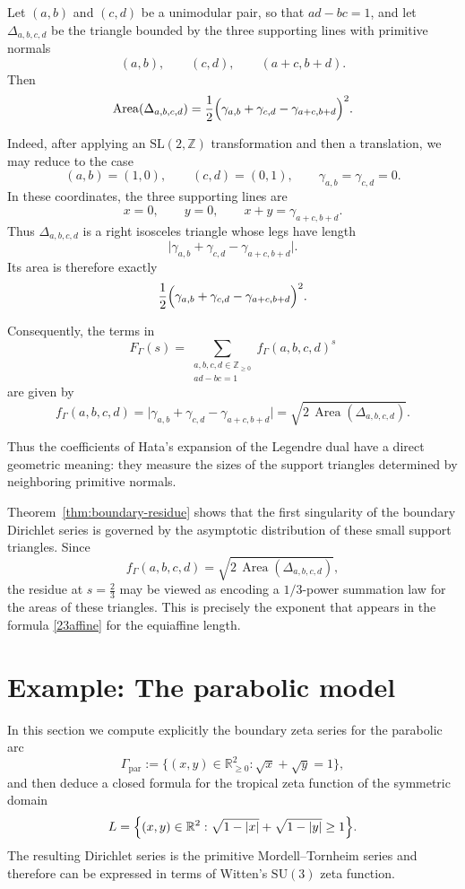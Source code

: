 \documentclass[a4paper,american,11pt]{amsart}
\theoremstyle{plain}
\theoremstyle{definition}
\newcommand{\Z}{\mathbb Z}
\newcommand{\R}{\mathbb R}
\DeclareMathOperator{\Area}{Area}
\begin{document}
Let \((a,b)\) and \((c,d)\) be a unimodular pair, so that \(ad-bc=1\), and
let \(\Delta_{a,b,c,d}\) be the triangle bounded by the three supporting lines
with primitive normals
\[
(a,b),
\qquad
(c,d),
\qquad
(a+c,b+d).
\]
Then
\[
\Area(\Delta_{a,b,c,d})
=
\frac12
\Bigl(\gamma_{a,b}+\gamma_{c,d}-\gamma_{a+c,b+d}\Bigr)^2.
\]

Indeed, after applying an \(\mathrm{SL}(2,\Z)\) transformation and then a
translation, we may reduce to the case
\[
(a,b)=(1,0),
\qquad
(c,d)=(0,1),
\qquad
\gamma_{a,b}=\gamma_{c,d}=0.
\]
In these coordinates, the three supporting lines are
\[
x=0,
\qquad
y=0,
\qquad
x+y=\gamma_{a+c,b+d}.
\]
Thus \(\Delta_{a,b,c,d}\) is a right isosceles triangle whose legs have length
\[
\bigl|\gamma_{a,b}+\gamma_{c,d}-\gamma_{a+c,b+d}\bigr|.
\]
Its area is therefore exactly
\[
\frac12
\Bigl(\gamma_{a,b}+\gamma_{c,d}-\gamma_{a+c,b+d}\Bigr)^2.
\]

Consequently, the terms in
\[
F_\Gamma(s)
=
\sum_{\substack{a,b,c,d\in\Z_{\ge0}\\ ad-bc=1}}
f_\Gamma(a,b,c,d)^s
\]
are given by
\[
f_\Gamma(a,b,c,d)
=
\bigl|\gamma_{a,b}+\gamma_{c,d}-\gamma_{a+c,b+d}\bigr|
=
\sqrt{2\,\Area(\Delta_{a,b,c,d})}.
\]

Thus the coefficients of Hata's expansion of the Legendre dual have a direct
geometric meaning: they measure the sizes of the support triangles determined
by neighboring primitive normals.

Theorem~\ref{thm:boundary-residue} shows that the first singularity of the
boundary Dirichlet series is governed by the asymptotic distribution of these
small support triangles. Since
\[
f_\Gamma(a,b,c,d)=\sqrt{2\,\Area(\Delta_{a,b,c,d})},
\]
the residue at \(s=\frac23\) may be viewed as encoding a \(1/3\)-power
summation law for the areas of these triangles. This is precisely the exponent
that appears in the formula \eqref{23affine} for the equiaffine length.
\section{Example: The parabolic model}\label{sec4}

In this section we compute explicitly the boundary zeta series for the
parabolic arc
\[
\Gamma_{\mathrm{par}}
:=
\{(x,y)\in \R_{\ge 0}^2:\sqrt{x}+\sqrt{y}=1\},
\]
and then deduce a closed formula for the tropical zeta function of the
symmetric domain
\[
L
=
\Bigl\{
(x,y)\in\R^2:\sqrt{1-|x|}+\sqrt{1-|y|}\ge 1
\Bigr\}.
\]
The resulting Dirichlet series is the primitive Mordell--Tornheim series and
therefore can be expressed in terms of Witten's \(\mathrm{SU}(3)\) zeta
function.
\end{document}

